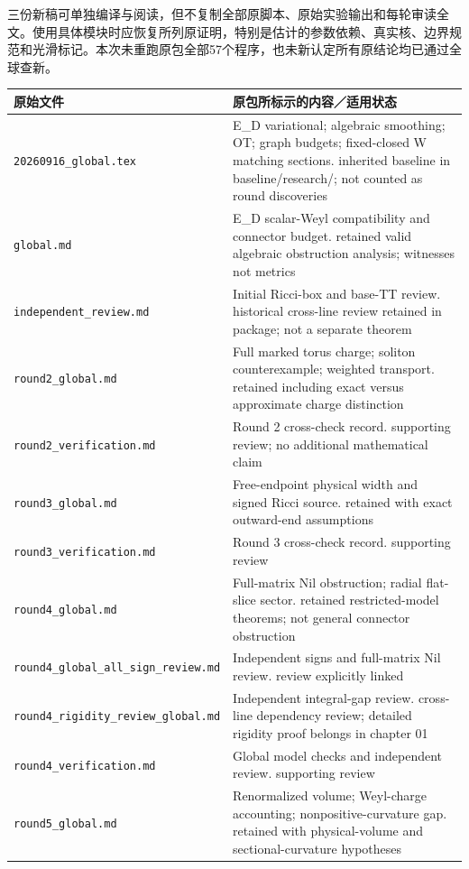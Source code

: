 \documentclass[UTF8,fontset=fandol,zihao=-4]{ctexart}
\theoremstyle{cn}
\begin{document}
三份新稿可单独编译与阅读，但不复制全部原脚本、原始实验输出和每轮审读全文。使用具体模块时应恢复所列原证明，特别是估计的参数依赖、真实核、边界规范和光滑标记。本次未重跑原包全部57个程序，也未新认定所有原结论均已通过全球查新。

\small
\begin{longtable}{L{.34\textwidth}L{.59\textwidth}}
\toprule 原始文件 & 原包所标示的内容／适用状态\\\midrule\endhead
\nolinkurl{20260916_global.tex} & E\_D variational; algebraic smoothing; OT; graph budgets; fixed-closed W matching sections. inherited baseline in baseline/research/; not counted as round discoveries\\
\nolinkurl{global.md} & E\_D scalar-Weyl compatibility and connector budget. retained valid algebraic obstruction analysis; witnesses not metrics\\
\nolinkurl{independent_review.md} & Initial Ricci-box and base-TT review. historical cross-line review retained in package; not a separate theorem\\
\nolinkurl{round2_global.md} & Full marked torus charge; soliton counterexample; weighted transport. retained including exact versus approximate charge distinction\\
\nolinkurl{round2_verification.md} & Round 2 cross-check record. supporting review; no additional mathematical claim\\
\nolinkurl{round3_global.md} & Free-endpoint physical width and signed Ricci source. retained with exact outward-end assumptions\\
\nolinkurl{round3_verification.md} & Round 3 cross-check record. supporting review\\
\nolinkurl{round4_global.md} & Full-matrix Nil obstruction; radial flat-slice sector. retained restricted-model theorems; not general connector obstruction\\
\nolinkurl{round4_global_all_sign_review.md} & Independent signs and full-matrix Nil review. review explicitly linked\\
\nolinkurl{round4_rigidity_review_global.md} & Independent integral-gap review. cross-line dependency review; detailed rigidity proof belongs in chapter 01\\
\nolinkurl{round4_verification.md} & Global model checks and independent review. supporting review\\
\nolinkurl{round5_global.md} & Renormalized volume; Weyl-charge accounting; nonpositive-curvature gap. retained with physical-volume and sectional-curvature hypotheses\\

\end{longtable}
\end{document}
